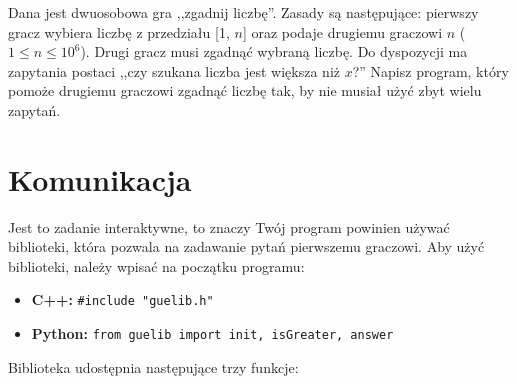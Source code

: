 \documentclass{spiral}
\begin{document}
    \makeheader

    \noindent Dana jest dwuosobowa gra ,,zgadnij liczbę''. Zasady są następujące:
    pierwszy gracz wybiera liczbę z przedziału [1, $n$]
    oraz podaje drugiemu graczowi $n$ ($1 \leq n \leq 10^6$).
    Drugi gracz musi zgadnąć wybraną liczbę. 
    Do dyspozycji ma zapytania postaci ,,czy szukana liczba jest większa niż $x$?''
    Napisz program, który pomoże drugiemu graczowi zgadnąć liczbę tak,
    by nie musiał użyć zbyt wielu zapytań.

\section{Komunikacja}
    Jest to zadanie interaktywne,
    to znaczy Twój program powinien używać biblioteki,
    która pozwala na zadawanie pytań pierwszemu graczowi.
    Aby użyć biblioteki, należy wpisać na początku programu:
    \begin{itemize}
        \item \textbf{C++:}
            \verb|#include "guelib.h"|

        \item \textbf{Python:}
            \texttt{from guelib import init, isGreater, answer}
    \end{itemize}
    Biblioteka udostępnia następujące trzy funkcje:
\end{document}
